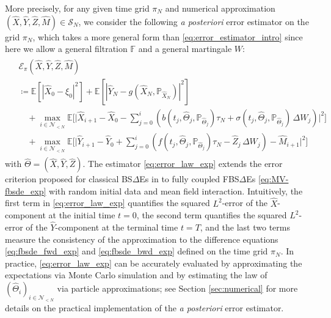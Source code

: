 \documentclass[11pt]{article}
\numberwithin{equation}{section}
\theoremstyle{definition}
\theoremstyle{remark}
\def\l{\label}  \def\f{\frac}  \def\fa{\forall}
\def\cE{\mathcal{E}}
\def\cN{\mathcal{N}}
\def\cS{\mathcal{S}}
\def\sE{{\mathbb{E}}}
\def\sF{{\mathbb{F}}}
\def\sP{\mathbb{P}}
\begin{document}
More precisely, for any given
time grid $\pi_N$
and
numerical approximation  $(\hat{X},\hat{Y},\hat{Z}, \hat{M})\in\cS_N$,
 we  consider the following \textit{a posteriori} error estimator  on the grid $\pi_N$,
which takes a  more general form than  \eqref{eq:error_estimator_intro} %
since here we allow a general filtration $\sF$ and a general  martingale $W$:
\begin{align}\l{eq:error_law_exp}
\begin{split}
&\cE_\pi(\hat{X},\hat{Y},\hat{Z}, \hat{M})
\\
&\coloneqq
\sE[|\hat{X}_0-\xi_0|^2]
+
\sE[|\hat{Y}_N-g(\hat{X}_N,\sP_{\hat{X}_N})|^2]
\\
&\quad +
\max_{i\in \cN_{<N}}
\sE
\bigg[
\bigg|
\hat{X}_{i+1}
-\hat{X}_{0}
-\sum_{j=0}^i
\left(
b(t_{j},\hat{\Theta}_{j},\sP_{\hat{\Theta}_{j}})\tau_N  +
\sigma (t_j,\hat{\Theta}_j,\sP_{\hat{\Theta}_j})\, \Delta W_j
\right)
\bigg|^2
\bigg]\\
&\quad +
\max_{i\in \cN_{<N}}
\sE\bigg[
\bigg|
\hat{Y}_{i+1}-\hat{Y}_0
+\sum_{j=0}^{i}
\left(
f(t_{j},\hat{\Theta}_{j}, \sP_{\hat{\Theta}_{j}})\tau_N- \hat{Z}_j\,\Delta W_j
\right)
- \hat{M}_{i+1}
\bigg|^2
\bigg]
\end{split}
\end{align}
with $\hat{\Theta}=(\hat{X},\hat{Y},\hat{Z})$.
The estimator \eqref{eq:error_law_exp} extends the error criterion 
proposed for classical  BS$\Delta$Es in \cite{bender2013}
to 
fully coupled FBS$\Delta$Es \eqref{eq:MV-fbsde_exp}
with random initial data and mean field interaction.
Intuitively, the first term in \eqref{eq:error_law_exp} quantifies  the squared $L^2$-error of the $\hat{X}$-component at the initial time $t=0$,
the second term quantifies the  squared $L^2$-error of the $\hat{Y}$-component at the terminal time $t=T$,
and the last two terms measure 
the consistency of the approximation to the difference equations
\eqref{eq:fbsde_fwd_exp} and \eqref{eq:fbsde_bwd_exp}
defined on the time grid $\pi_N$.
In practice, 
\eqref{eq:error_law_exp}
 can be accurately evaluated
by 
approximating the expectations 
via Monte Carlo simulation
and 
by estimating the law of $({\hat{\Theta}_i})_{i\in \cN_{<N}}$ via  particle approximations;
see Section \ref{sec:numerical} for more details on the practical implementation 
of the \textit{a posteriori} error estimator.

\color{black}
\end{document}
